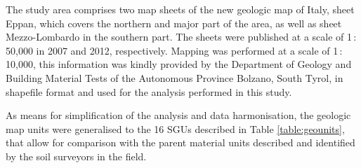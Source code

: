 \documentclass[preprint,12pt,authoryear]{elsarticle}
\begin{document}
The study area comprises two map sheets of the new geologic map of Italy, sheet Eppan,  which covers the northern and major part of the area, as well as sheet Mezzo-Lombardo in the southern part. The sheets were published at a scale of 1\,:\,50,000 in 2007 and 2012, respectively. Mapping was performed at a scale of 1\,:\,10,000, this information was kindly provided by the Department of Geology and Building Material Tests of the Autonomous Province Bolzano, South Tyrol, in shapefile format and used for the analysis performed in this study.
 
As means for simplification of the analysis and data harmonisation, the geologic map units were generalised to the 16 SGUs described in Table \ref{table:geounits}, that allow for comparison with the parent material units described and identified by the soil surveyors in the field.
\end{document}
